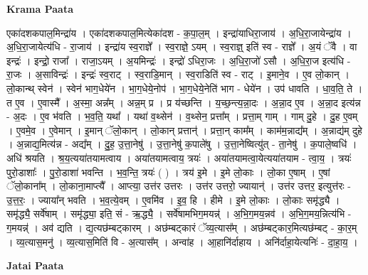 \documentclass[17pt]{extarticle}
\begin{document}
\textbf{Krama Paata} \newline

एका॑दशकपाल॒मिन्द्रा॑य । एका॑दशकपाल॒मित्येका॑दश - क॒पा॒ल॒म् । इन्द्रा॑याधिरा॒जाय॑ । अ॒धि॒रा॒जायेन्द्रा॑य । अ॒धि॒रा॒जायेत्य॑धि - रा॒जाय॑ । इन्द्रा॑य स्व॒राज्ञे᳚ । स्व॒राज्ञे॒ ऽयम् । स्व॒राज्ञ्॒ इति॑ स्व - राज्ञे᳚ । अ॒यं ॅवै । वा इन्द्रः॑ । इन्द्रो॒ राजा᳚ । राजा॒ऽयम् । अ॒यमिन्द्रः॑ । इन्द्रो॑ ऽधिरा॒जः । अ॒धि॒रा॒जो॑ ऽसौ । अ॒धि॒रा॒ज इत्य॑धि - रा॒जः । अ॒साविन्द्रः॑ । इन्द्रः॑ स्व॒राट् । स्व॒राडि॒मान् । स्व॒राडिति॑ स्व - राट् । इ॒माने॒व । ए॒व लो॒कान् । लो॒कान्थ् स्वेन॑ । स्वेन॑ भाग॒धेये॑न । भा॒ग॒धेये॒नोप॑ । भा॒ग॒धेये॒नेति॑ भाग - धेये॑न । उप॑ धावति । धा॒व॒ति॒ ते । त ए॒व । ए॒वास्मै᳚ । अ॒स्मा॒ अन्न᳚म् । अन्न॒म् प्र । प्र य॑च्छन्ति । य॒च्छ॒न्त्य॒न्ना॒दः । अ॒न्ना॒द ए॒व । अ॒न्ना॒द इत्य॑न्न - अ॒दः । ए॒व भ॑वति । भ॒व॒ति॒ यथा᳚ । यथा॑ व॒थ्सेन॑ । व॒थ्सेन॒ प्रत्ता᳚म् । प्रत्ता॒म् गाम् । गाम् दु॒हे । दु॒ह ए॒वम् । ए॒वमे॒व । ए॒वेमान् । इ॒मान् ॅलो॒कान् । लो॒कान् प्रत्तान्॑ । प्रत्ता॒न् काम᳚म् । काम॑म॒न्नाद्य᳚म् । अ॒न्नाद्य॑म् दुहे । अ॒न्नाद्य॒मित्य॑न्न - अद्य᳚म् । दु॒ह॒ उ॒त्ता॒नेषु॑ । उ॒त्ता॒नेषु॑ क॒पाले॑षु । उ॒त्ता॒नेष्वित्यु॑त् - ता॒नेषु॑ । क॒पाले॒ष्वधि॑ । अधि॑ श्रयति । श्र॒य॒त्यया॑तयामत्वाय । अया॑तयामत्वाय॒ त्रयः॑ । अया॑तयामत्वा॒येत्यया॑तयाम - त्वा॒य॒ । त्रयः॑ पुरो॒डाशाः᳚ । पु॒रो॒डाशा॑ भवन्ति । भ॒व॒न्ति॒ त्रयः॑ ( ) । त्रय॑ इ॒मे । इ॒मे लो॒काः । लो॒का ए॒षाम् । ए॒षां ॅलो॒काना᳚म् । लो॒काना॒माप्त्यै᳚ । आप्त्या॒ उत्त॑र उत्तरः । उत्त॑र उत्तरो॒ ज्यायान्॑ । उत्त॑र उत्तर॒ इत्युत्त॑रः - उ॒त्त॒रः॒ । ज्याया᳚न् भवति । भ॒व॒त्ये॒वम् । ए॒वमि॑व । इ॒व॒ हि । हीमे । इ॒मे लो॒काः । लो॒काः समृ॑द्ध्यै । समृ॑द्ध्यै॒ सर्वे॑षाम् । समृ॑द्ध्या॒ इति॒ सं - ऋ॒द्ध्यै॒ । सर्वे॑षामभिग॒मयन्न्॑ । अ॒भि॒ग॒मय॒न्नव॑ । अ॒भि॒ग॒मय॒न्नित्य॑भि - ग॒मयन्न्॑ । अव॑ द्यति । द्य॒त्यछ॑म्बट्कारम् । अछ॑म्बट्कारं ॅव्य॒त्यास᳚म् । अछ॑म्बट्कार॒मित्यछ॑म्बट् - का॒र॒म् । व्य॒त्यास॒मनु॑ । व्य॒त्यास॒मिति॑ वि - अ॒त्यास᳚म् । अन्वा॑ह । आ॒हानि॑र्दाहाय । अनि॑र्दाहा॒येत्यनिः॑ - दा॒हा॒य॒ । \newline

\textbf{Jatai Paata} \newline
\end{document}
